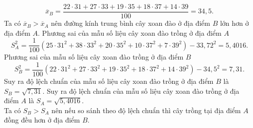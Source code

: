 \begin{ex}
{\begin{itemchoice}
			$$ \overline{x}_B=\dfrac{22\cdot31+27\cdot33+19\cdot35+18\cdot37+14\cdot39}{100}=34{,}5.$$
			Ta có $\overline{x}_B>\overline{x}_A$ nên đường kính trung bình cây xoan đào ở địa điểm $ B $ lớn hơn ở địa điểm $ A $.
			\itemch  Phương sai của mẫu số liệu cây xoan đào trồng ở địa điểm $ A $
			$$ S_A^2=\dfrac{1}{100}\left(25\cdot31^2+38\cdot33^2+20\cdot35^2+10\cdot37^2+7\cdot39^2 \right)- 33{,}72^2=5{,}4016. $$
			\itemch  Phương sai của mẫu số liệu cây xoan đào trồng ở địa điểm $ B $
			$$ S_B^2=\dfrac{1}{100}\left(22\cdot31^2+27\cdot33^2+19\cdot35^2+18\cdot37^2+14\cdot39^2 \right)- 34{,}5^2=7{,}31. $$
			Suy ra độ lệch chuẩn của mẫu số liệu cây xoan đào trồng ở địa điểm $ B $ là $ S_B=\sqrt{7{,}31} $.
			\itemch 
			Suy ra độ lệch chuẩn của mẫu số liệu cây xoan đào trồng ở địa điểm $ A $ là $ S_A=\sqrt{5{,}4016} $.\\
			Ta có $ S_B > S_A $ nên nếu so sánh theo độ lệch chuẩn thì cây trồng tại địa điểm $ A $ đồng đều hơn ở địa điểm $ B $.
		\end{itemchoice}
	}
\end{ex}

